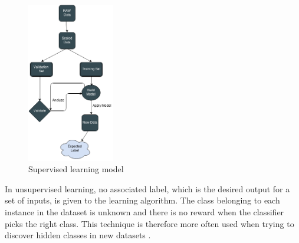 \begin{figure}[H]
\centering
    \includegraphics[width=38mm,scale=0.3]{./img/SL.png}
    \caption{\footnotesize{Supervised learning model}}
    \label{fig:SL}
\end{figure}

In unsupervised learning, no associated label, which is the desired output for a set of inputs, is given to the learning algorithm. The class belonging to each instance in the dataset is unknown and there is no reward when the classifier picks the right class. This technique is therefore more often used when trying to discover hidden classes in new datasets \cite{maglogiannis2007emerging}.






